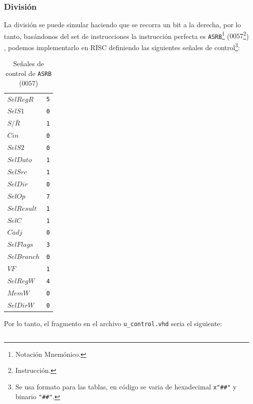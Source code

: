 \documentclass{IEEEtran}
\newenvironment{code}{\captionsetup{type=listing}}{}
\begin{document}
\subsubsection{División}
\label{sec:org5d40ad6}
La división se puede simular haciendo que se recorra un bit a la derecha, por lo tanto, basándonos del set de instrucciones la instrucción perfecta es \texttt{ASRB}\footnote{Notación Mnemónico.} (\(0057\)\footnote{Instrucción.}) \cite[p. 24]{PM1999}, podemos implementarlo en RISC definiendo las siguientes señales de control\footnote{Se usa formato para las tablas, en código se varia de hexadecimal \texttt{x"\#\#"} y binario \texttt{"\#\#"}.}:
\begin{table}[htbp]
\caption{Señales de control de \texttt{ASRB} (\(0057\))}
\centering
\begin{tabular}{ll}
\hline
\(SelRegR\) & \texttt{5}\\
\(SelS1\) & \texttt{0}\\
\(S/\bar{R}\) & \texttt{1}\\
\(Cin\) & \texttt{0}\\
\(SelS2\) & \texttt{0}\\
\(SelDato\) & \texttt{1}\\
\(SelSrc\) & \texttt{1}\\
\(SelDir\) & \texttt{0}\\
\(SelOp\) & \texttt{7}\\
\(SelResult\) & \texttt{1}\\
\(SelC\) & \texttt{1}\\
\(Cadj\) & \texttt{0}\\
\(SelFlags\) & \texttt{3}\\
\(SelBranch\) & \texttt{0}\\
\(VF\) & \texttt{1}\\
\(SelRegW\) & \texttt{4}\\
\(MemW\) & \texttt{0}\\
\(SelDirW\) & \texttt{0}\\
\hline
\end{tabular}
\end{table}
Por lo tanto, el fragmento en el archivo \texttt{u\_control.vhd} seria el siguiente:
\begin{code}
\caption{\texttt{ASRB} en \texttt{u\_control.vhd}}
\inputminted[firstline=413, lastline=431]{vhdl}{../Risc/u_control.vhd}
\end{code}
\end{document}
